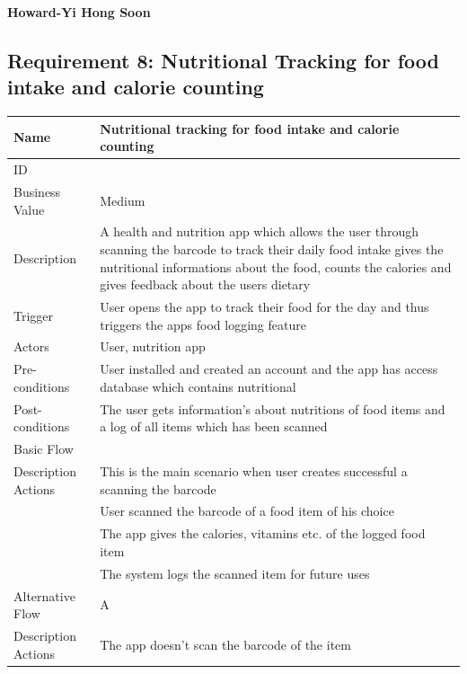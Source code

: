 \documentclass{article}
\begin{document}
		\textbf{Howard-Yi Hong Soon}
		\subsection{Requirement 8: Nutritional Tracking for food intake and calorie counting}
		\begin{center}
			
			\begin{table}[htbp]
			\begin{tabularx}{1.0\textwidth}{|>{\raggedright\arraybackslash}p{}|>{\raggedright\arraybackslash}X|}
				\hline
				Name             & Nutritional tracking for food intake and calorie counting \\ \hline
				ID               & 8 \\ \hline
				Business Value   & Medium \\ \hline
				Description      & A health and nutrition app which allows the user through scanning the barcode
									to track their daily food intake gives the nutritional informations about the food, counts the calories and gives feedback about the 
									users dietary \\ \hline
				Trigger          & User opens the app to track their food for the day and thus triggers the apps food logging feature\\ \hline
				Actors           & User, nutrition app\\ \hline
				Pre-conditions   & User installed and created an account and the app has access database which contains nutritional\\ \hline
				Post-conditions  & The user gets information's about nutritions of food items and a log of all items which has been scanned\\ \hline
				Basic Flow       & \\ \hline
								Description Actions& This is the main scenario when user creates successful a scanning the barcode \\ \hline
								1 & User scanned the barcode of a food item of his choice \\ \hline
								2 & The app gives the calories, vitamins etc. of the logged food item \\ \hline
								3 & The system logs the scanned item for future uses \\ \hline
				Alternative Flow & A \\ \hline
								Description Actions& The app doesn't scan the barcode of the item \\ \hline

\end{tabularx}
\end{table}
\end{center}
\end{document}
